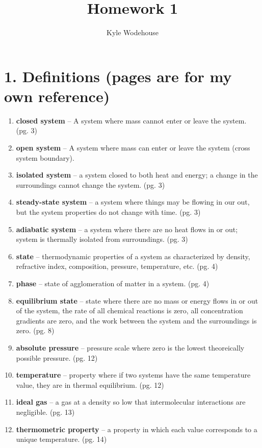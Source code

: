 \documentclass{article}
\title{\bfseries Homework 1}
\author{Kyle Wodehouse}
\begin{document}
\maketitle

\section*{1. Definitions \small (pages are for my own reference)}

\begin{enumerate}[label= (\alph*)]
    \item \textbf{closed system} -- A system where mass cannot enter or leave the system. (pg. 3)
    \item \textbf{open system} -- A system where mass can enter or leave the system (cross system boundary).
    \item \textbf{isolated system} -- a system closed to both heat and energy; a change in the surroundings cannot change the system. (pg. 3)
    \item \textbf{steady-state system} -- a system where things may be flowing in our out, but the system properties do not change with time. (pg. 3)
    \item \textbf{adiabatic system} -- a system where there are no heat flows in or out; system is thermally isolated from surroundings. (pg. 3)
    \item \textbf{state} -- thermodynamic properties of a system as characterized by density, refractive index, composition, pressure, temperature, etc. (pg. 4)
    \item \textbf{phase} -- state of agglomeration of matter in a system. (pg. 4)
    \item \textbf{equilibrium state} -- state where there are no mass or energy flows in or out of the system, the rate of all chemical reactions is zero, all concentration gradients are zero, and the work between the system and the surroundings is zero. (pg. 8)
    \item \textbf{absolute pressure} -- pressure scale where zero is the lowest theoreically possible pressure. (pg. 12)
    \item \textbf{temperature} -- property where if two systems have the same temperature value, they are in thermal equilibrium. (pg. 12)
    \item \textbf{ideal gas} -- a gas at a density so low that intermolecular interactions are negligible. (pg. 13)
    \item \textbf{thermometric property} -- a property in which each value corresponds to a unique temperature. (pg. 14)

\end{enumerate}
\end{document}
